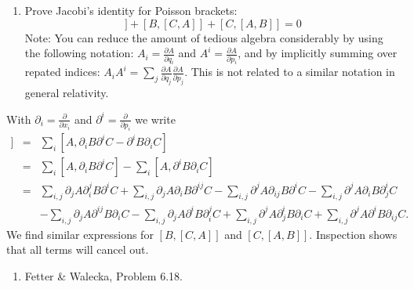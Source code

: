 \documentclass[letterpaper,11pt]{article}
\begin{document}
\begin{enumerate}[resume]
 \item Prove Jacobi's identity for Poisson brackets:
 \begin{equation*}
  [A,[B,C]] + [B,[C,A]] + [C,[A,B]] = 0
 \end{equation*}
 Note: You can reduce the amount of tedious algebra considerably by using the following notation: $A_i = \frac{\partial A}{\partial q_i}$ and $A^i = \frac{\partial A}{\partial p_i}$, and by implicitly summing over repated indices: $A_i A^i = \sum_j \frac{\partial A}{\partial q_j} \frac{\partial A}{\partial p_j}$.  This is not related to a similar notation in general relativity.
\end{enumerate}

With $\partial_i = \frac{\partial}{\partial x_i}$ and $\partial^i = \frac{\partial}{\partial p_i}$ we write
\begin{eqnarray*}
 [A,[B,C]] & = & \sum_i [A,\partial_i B \partial^i C - \partial^i B \partial_i C] \\
 & = & \sum_i [A,\partial_i B \partial^i C] - \sum_i [A,\partial^i B \partial_i C] \\
 & = & \sum_{i,j} \partial_j A \partial_i^j B \partial^i C + \sum_{i,j} \partial_j A \partial_i B \partial^{ij} C - \sum_{i,j} \partial^j A \partial_{ij} B \partial^i C - \sum_{i,j} \partial^j A \partial_i B \partial^i_j C \\
 & & - \sum_{i,j} \partial_j A \partial^{ij} B \partial_i C - \sum_{i,j} \partial_j A \partial^i B \partial_i^j C + \sum_{i,j} \partial^j A \partial^i_j B \partial_i C + \sum_{i,j} \partial^j A \partial^i B \partial_{ij} C.
\end{eqnarray*}
We find similar expressions for $[B,[C,A]]$ and $[C,[A,B]]$.  Inspection shows that all terms will cancel out.

\begin{enumerate}[resume]
 \item Fetter \& Walecka, Problem 6.18.
\end{enumerate}
\end{document}
